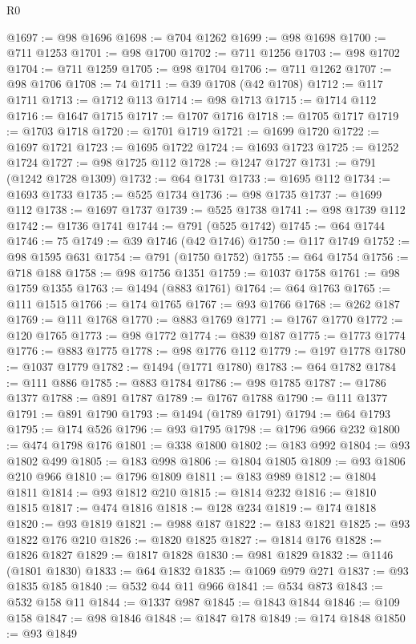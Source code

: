 \begin{lexlean}{R0}
\begin{coremodule}
@1697 := @98 @1696
@1698 := @704 @1262
@1699 := @98 @1698
@1700 := @711 @1253
@1701 := @98 @1700
@1702 := @711 @1256
@1703 := @98 @1702
@1704 := @711 @1259
@1705 := @98 @1704
@1706 := @711 @1262
@1707 := @98 @1706
@1708 := 74
@1711 := @39 @1708 (@42 @1708)
@1712 := @117 @1711
@1713 := @1712 @113
@1714 := @98 @1713
@1715 := @1714 @112
@1716 := @1647 @1715
@1717 := @1707 @1716
@1718 := @1705 @1717
@1719 := @1703 @1718
@1720 := @1701 @1719
@1721 := @1699 @1720
@1722 := @1697 @1721
@1723 := @1695 @1722
@1724 := @1693 @1723
@1725 := @1252 @1724
@1727 := @98 @1725 @112
@1728 := @1247 @1727
@1731 := @791 (@1242 @1728 @1309)
@1732 := @64 @1731
@1733 := @1695 @112
@1734 := @1693 @1733
@1735 := @525 @1734
@1736 := @98 @1735
@1737 := @1699 @112
@1738 := @1697 @1737
@1739 := @525 @1738
@1741 := @98 @1739 @112
@1742 := @1736 @1741
@1744 := @791 (@525 @1742)
@1745 := @64 @1744
@1746 := 75
@1749 := @39 @1746 (@42 @1746)
@1750 := @117 @1749
@1752 := @98 @1595 @631
@1754 := @791 (@1750 @1752)
@1755 := @64 @1754
@1756 := @718 @188
@1758 := @98 @1756 @1351
@1759 := @1037 @1758
@1761 := @98 @1759 @1355
@1763 := @1494 (@883 @1761)
@1764 := @64 @1763
@1765 := @111 @1515
@1766 := @174 @1765
@1767 := @93 @1766
@1768 := @262 @187
@1769 := @111 @1768
@1770 := @883 @1769
@1771 := @1767 @1770
@1772 := @120 @1765
@1773 := @98 @1772
@1774 := @839 @187
@1775 := @1773 @1774
@1776 := @883 @1775
@1778 := @98 @1776 @112
@1779 := @197 @1778
@1780 := @1037 @1779
@1782 := @1494 (@1771 @1780)
@1783 := @64 @1782
@1784 := @111 @886
@1785 := @883 @1784
@1786 := @98 @1785
@1787 := @1786 @1377
@1788 := @891 @1787
@1789 := @1767 @1788
@1790 := @111 @1377
@1791 := @891 @1790
@1793 := @1494 (@1789 @1791)
@1794 := @64 @1793
@1795 := @174 @526
@1796 := @93 @1795
@1798 := @1796 @966 @232
@1800 := @474 @1798 @176
@1801 := @338 @1800
@1802 := @183 @992
@1804 := @93 @1802 @499
@1805 := @183 @998
@1806 := @1804 @1805
@1809 := @93 @1806 @210 @966
@1810 := @1796 @1809
@1811 := @183 @989
@1812 := @1804 @1811
@1814 := @93 @1812 @210
@1815 := @1814 @232
@1816 := @1810 @1815
@1817 := @474 @1816
@1818 := @128 @234
@1819 := @174 @1818
@1820 := @93 @1819
@1821 := @988 @187
@1822 := @183 @1821
@1825 := @93 @1822 @176 @210
@1826 := @1820 @1825
@1827 := @1814 @176
@1828 := @1826 @1827
@1829 := @1817 @1828
@1830 := @981 @1829
@1832 := @1146 (@1801 @1830)
@1833 := @64 @1832
@1835 := @1069 @979 @271
@1837 := @93 @1835 @185
@1840 := @532 @44 @11 @966
@1841 := @534 @873
@1843 := @532 @158 @11
@1844 := @1337 @987
@1845 := @1843 @1844
@1846 := @109 @158
@1847 := @98 @1846
@1848 := @1847 @178
@1849 := @174 @1848
@1850 := @93 @1849

\end{coremodule}
\end{lexlean}
